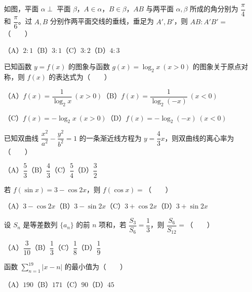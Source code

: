 \begin{question}
如图，平面 $\alpha\perp$ 平面 $\beta$，$A\in\alpha$，$B\in\beta$，$AB$ 与两平面 $\alpha,\beta$ 所成的角分别为 $\dfrac\pi4$ 和 $\dfrac\pi6$。过 $A,B$ 分别作两平面交线的垂线，垂足为 $A',B'$，则 $AB:A'B'=$\mbox{（　　）}
\nopagebreak[4]
\begin{center}\end{center}
\nopagebreak[4]
（A）$2:1$\quad（B）$3:1$\quad（C）$3:2$\quad（D）$4:3$

\end{question}
\begin{question}
已知函数 $y=f(x)$ 的图象与函数 $g(x)=\log_2x\ (x>0)$ 的图象关于原点对称，则 $f(x)$ 的表达式为\mbox{（　　）}

（A）$f(x)=\dfrac1{\log_2x}\ (x>0)$\quad（B）$f(x)=\dfrac1{\log_2(-x)}\ (x<0)$

（C）$f(x)=-\log_2x\ (x>0)$\quad（D）$f(x)=-\log_2(-x)\ (x<0)$

\end{question}
\begin{question}
已知双曲线 $\dfrac{x^2}{a^2}-\dfrac{y^2}{b^2}=1$ 的一条渐近线方程为 $y=\dfrac43x$，则双曲线的离心率为\mbox{（　　）}

（A）$\dfrac53$\quad（B）$\dfrac43$\quad（C）$\dfrac54$\quad（D）$\dfrac32$

\end{question}
\begin{question}
若 $f(\sin x)=3-\cos2x$，则 $f(\cos x)=$\mbox{（　　）}

（A）$3-\cos2x$\quad（B）$3-\sin2x$\quad（C）$3+\cos2x$\quad（D）$3+\sin2x$

\end{question}
\begin{question}
设 $S_n$ 是等差数列 $\{a_n\}$ 的前 $n$ 项和，若 $\dfrac{S_3}{S_6}=\dfrac13$，则 $\dfrac{S_6}{S_{12}}=$\mbox{（　　）}

（A）$\dfrac3{10}$\quad（B）$\dfrac13$\quad（C）$\dfrac18$\quad（D）$\dfrac19$

\end{question}
\begin{question}
函数 $\displaystyle\sum_{n=1}^{19}|x-n|$ 的最小值为\mbox{（　　）}

（A）$190$\quad（B）$171$\quad（C）$90$\quad（D）$45$

\end{question}

